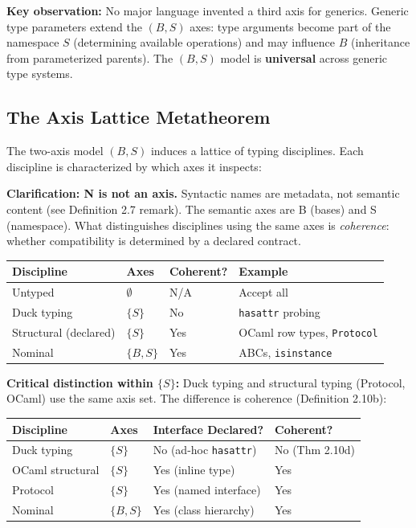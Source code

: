 \textbf{Key observation:} No major language invented a third axis for
generics. Generic type parameters extend the $(B, S)$ axes: type arguments become part of the namespace $S$ (determining available operations) and may influence $B$ (inheritance from parameterized parents). The $(B, S)$ model is \textbf{universal} across generic type systems.

\subsection{The Axis Lattice
Metatheorem}\label{the-axis-lattice-metatheorem}

The two-axis model \((B, S)\) induces a lattice of typing
disciplines. Each discipline is characterized by which axes it inspects:

\textbf{Clarification: N is not an axis.} Syntactic names are metadata, not semantic content (see Definition 2.7 remark). The semantic axes are B (bases) and S (namespace). What distinguishes disciplines using the same axes is \emph{coherence}: whether compatibility is determined by a declared contract.

\small
\begin{longtable}[]{@{}llll@{}}
\toprule\noalign{}
Discipline & Axes & Coherent? & Example \\
\midrule\noalign{}
\endhead
\bottomrule\noalign{}
\endlastfoot
Untyped & \(\emptyset\) & N/A & Accept all \\
Duck typing & \(\{S\}\) & No & \texttt{hasattr} probing \\
Structural (declared) & \(\{S\}\) & Yes & OCaml row types, \texttt{Protocol} \\
Nominal & \(\{B, S\}\) & Yes & ABCs, \texttt{isinstance} \\
\end{longtable}

\textbf{Critical distinction within \(\{S\}\):} Duck typing and structural typing (Protocol, OCaml) use the same axis set. The difference is coherence (Definition 2.10b):

\small
\begin{longtable}[]{@{}llll@{}}
\toprule\noalign{}
Discipline & Axes & Interface Declared? & Coherent? \\
\midrule\noalign{}
\endhead
\bottomrule\noalign{}
\endlastfoot
Duck typing & \(\{S\}\) & No (ad-hoc \texttt{hasattr}) & No (Thm 2.10d) \\
OCaml structural & \(\{S\}\) & Yes (inline type) & Yes \\
Protocol & \(\{S\}\) & Yes (named interface) & Yes \\
Nominal & \(\{B, S\}\) & Yes (class hierarchy) & Yes \\
\end{longtable}

